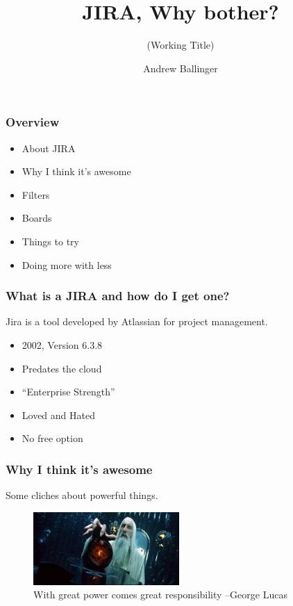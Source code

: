 \documentclass{beamer}
\title{ JIRA, Why bother? }
\subtitle{(Working Title)}
\author{Andrew Ballinger}
\begin{document}
\frame{\titlepage}

\begin{frame}[fragile]
  \frametitle{Overview}

  \begin{itemize}
  \item{About JIRA}
  \item{Why I think it's awesome}
  \item{Filters}
  \item{Boards}
  \item{Things to try}
  \item{Doing more with less}
  \end{itemize}

\end{frame}

\begin{frame}[fragile]
  
  \frametitle{What is a JIRA and how do I get one?}
  Jira is a tool developed by Atlassian for project management.

  \begin{itemize}
  \item{2002, Version 6.3.8}
  \item{Predates the cloud}
  \item{``Enterprise Strength''}
  \item{Loved and Hated} %
  \item{No free option} %
  \end{itemize}

\end{frame}

\begin{frame}[fragile]
  
  \frametitle{Why I think it's awesome}
  Some cliches about powerful things.
  \begin{figure}[p]
    \centering
    \includegraphics[width=15em]{palantir.jpg}
    \caption{With great power comes great responsibility --George Lucas}
  \end{figure}

\end{frame}
\end{document}
